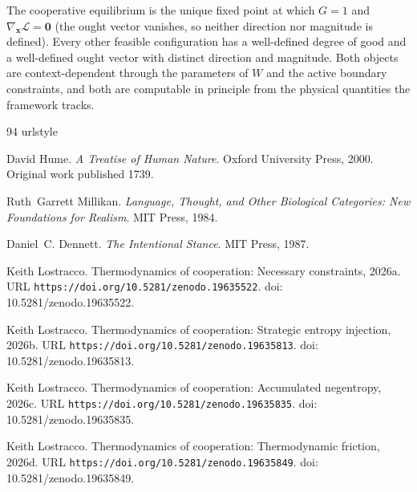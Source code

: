 \documentclass[11pt]{article}
\theoremstyle{plain}
\theoremstyle{definition}
\theoremstyle{remark}
\begin{document}
The cooperative equilibrium is the unique fixed point at which \(G = 1\)
and \(\nabla_{\mathbf{x}} \mathcal{L} = \mathbf{0}\) (the ought vector
vanishes, so neither direction nor magnitude is defined). Every other
feasible configuration has a well-defined degree of good and a
well-defined ought vector with distinct direction and magnitude. Both
objects are context-dependent through the parameters of \(W\) and the
active boundary constraints, and both are computable in principle from
the physical quantities the framework tracks.

\begin{thebibliography}{94}
\providecommand{\natexlab}[1]{#1}
\providecommand{\url}[1]{\texttt{#1}}
\expandafter\ifx\csname urlstyle\endcsname\relax
  \providecommand{\doi}[1]{doi: #1}\else
  \providecommand{\doi}{doi: \begingroup \urlstyle{rm}\Url}\fi

David Hume.
\newblock \emph{A Treatise of Human Nature}.
\newblock Oxford University Press, 2000.
\newblock Original work published 1739.

Ruth~Garrett Millikan.
\newblock \emph{Language, Thought, and Other Biological Categories: New
  Foundations for Realism}.
\newblock MIT Press, 1984.

Daniel~C. Dennett.
\newblock \emph{The Intentional Stance}.
\newblock MIT Press, 1987.

\bibitem[Lostracco(2026{\natexlab{a}})]{TC-I}
Keith Lostracco.
\newblock Thermodynamics of cooperation: Necessary constraints,
  2026{\natexlab{a}}.
\newblock URL \url{https://doi.org/10.5281/zenodo.19635522}.
\newblock \doi{10.5281/zenodo.19635522}.

\bibitem[Lostracco(2026{\natexlab{b}})]{TC-II}
Keith Lostracco.
\newblock Thermodynamics of cooperation: Strategic entropy injection,
  2026{\natexlab{b}}.
\newblock URL \url{https://doi.org/10.5281/zenodo.19635813}.
\newblock \doi{10.5281/zenodo.19635813}.

\bibitem[Lostracco(2026{\natexlab{c}})]{TC-III}
Keith Lostracco.
\newblock Thermodynamics of cooperation: Accumulated negentropy,
  2026{\natexlab{c}}.
\newblock URL \url{https://doi.org/10.5281/zenodo.19635835}.
\newblock \doi{10.5281/zenodo.19635835}.

\bibitem[Lostracco(2026{\natexlab{d}})]{TC-IV}
Keith Lostracco.
\newblock Thermodynamics of cooperation: Thermodynamic friction,
  2026{\natexlab{d}}.
\newblock URL \url{https://doi.org/10.5281/zenodo.19635849}.
\newblock \doi{10.5281/zenodo.19635849}.


\end{thebibliography}
\end{document}
